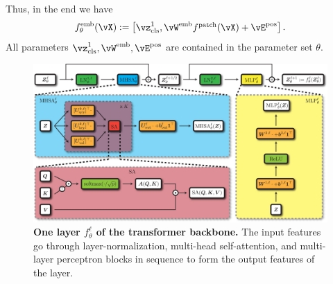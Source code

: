 \documentclass[../../book-main.tex]{subfiles}
\begin{document}
Thus, in the end we have 
\begin{equation}\label{eq:definition_of_embedding_module}
    f_{\theta}^{\emb}(\vX) := \mat{\vz_{\cls}^{1}, \vW^{\emb}f^{\patch}(\vX) + \vE^{\pos}}.
\end{equation}
All parameters \(\vz_{\cls}^{1}, \vW^{\emb}, \vE^{\pos}\) are contained in the parameter set \(\theta\).

\begin{figure}
    \centering 
    \includegraphics[width=\textwidth]{figs_chap7/transformer_backbone.pdf}
    \caption{\small\textbf{One layer \(f_{\theta}^{\ell}\) of the transformer backbone.} The input features go through layer-normalization, multi-head self-attention, and multi-layer perceptron blocks in sequence to form the output features of the layer.}
    \label{fig:transformer_backbone}
\end{figure}
\end{document}
